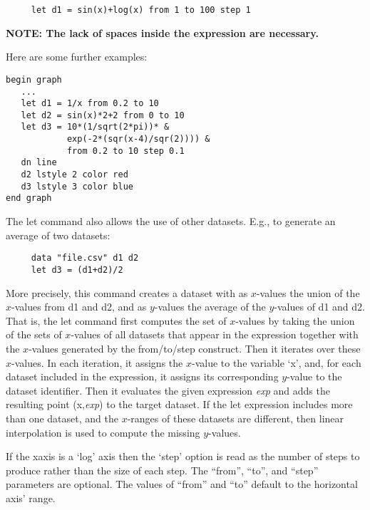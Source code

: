 \begin{commanddescription}
\begin{Verbatim}
     let d1 = sin(x)+log(x) from 1 to 100 step 1
\end{Verbatim}

{\bf NOTE: The lack of spaces inside the expression are necessary.}

Here are some further examples:

\begin{minipage}[c]{8cm}
\begin{Verbatim}
begin graph
   ...
   let d1 = 1/x from 0.2 to 10
   let d2 = sin(x)*2+2 from 0 to 10
   let d3 = 10*(1/sqrt(2*pi))* &
            exp(-2*(sqr(x-4)/sqr(2)))) &
            from 0.2 to 10 step 0.1
   dn line
   d2 lstyle 2 color red
   d3 lstyle 3 color blue
end graph
\end{Verbatim}
\end{minipage}
\hfill
\begin{minipage}[c]{7cm}
\mbox{}
\end{minipage}
\vspace{0.2cm}

The let command also allows the use of other datasets. E.g., to generate an average of two datasets:

\begin{Verbatim}
     data "file.csv" d1 d2
     let d3 = (d1+d2)/2
\end{Verbatim}

More precisely, this command creates a dataset with as $x$-values the union of the $x$-values from d1 and d2, and as $y$-values the average of the $y$-values of d1 and d2. That is, the let command first computes the set of $x$-values by taking the union of the sets of $x$-values of all datasets that appear in the expression together with the $x$-values generated by the from/to/step construct. Then it iterates over these $x$-values. In each iteration, it assigns the $x$-value to the variable `x', and, for each dataset included in the expression, it assigns its corresponding $y$-value to the dataset identifier. Then it evaluates the given expression {\it exp} and adds the resulting point (x,{\it exp}) to the target dataset. If the let expression includes more than one dataset, and the $x$-ranges of these datasets are different, then linear interpolation is used to compute the missing $y$-values.

If the xaxis is a `log' axis then the `step' option is read as the number of steps to produce rather than the size of each step. The ``from'', ``to'', and ``step'' parameters are optional. The values of ``from'' and ``to'' default to the horizontal axis' range.


\end{commanddescription}
